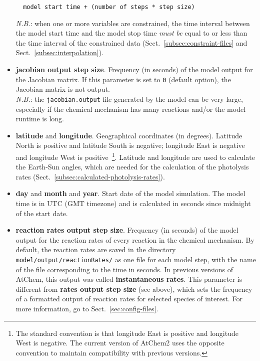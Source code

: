 \begin{itemize}
\begin{verbatim}
  model start time + (number of steps * step size)
  \end{verbatim}
  \textit{N.B.}: when one or more variables are constrained, the time
  interval between the model start time and the model stop time
  \emph{must be} equal to or less than the time interval of the
  constrained data (Sect.~\ref{subsec:constraint-files} and
  Sect.~\ref{subsec:interpolation}).
\item \textbf{jacobian output step size}. Frequency (in seconds) of
  the model output for the Jacobian matrix. If this parameter is set
  to \texttt{0} (default option), the Jacobian matrix is not
  output.\\
  \textit{N.B.}: the \texttt{jacobian.output} file generated by the
  model can be very large, especially if the chemical mechanism has
  many reactions and/or the model runtime is long.
\item \textbf{latitude} and \textbf{longitude}. Geographical
  coordinates (in degrees). Latitude North is positive and latitude
  South is negative; longitude East is negative and longitude West is
  positive~\footnote{The standard convention is that longitude East is
    positive and longitude West is negative. The current version of
    AtChem2 uses the opposite convention to maintain compatibility
    with previous versions.}. Latitude and longitude are used to
  calculate the Earth-Sun angles, which are needed for the calculation
  of the photolysis rates (Sect.~\ref{subsec:calculated-photolysis-rates}).
\item \textbf{day} and \textbf{month} and \textbf{year}. Start date of
  the model simulation. The model time is in UTC (GMT timezone) and is
  calculated in seconds since midnight of the start date.
\item \textbf{reaction rates output step size}. Frequency (in seconds)
  of the model output for the reaction rates of every reaction in the
  chemical mechanism. By default, the reaction rates are saved in the
  directory \texttt{model/output/reactionRates/} as one file for each
  model step, with the name of the file corresponding to the time in
  seconds. In previous versions of AtChem, this output was called
  \textbf{instantaneous rates}. This parameter is different from
  \textbf{rates output step size} (see above), which sets the
  frequency of a formatted output of reaction rates for selected
  species of interest. For more information, go to
  Sect.~\ref{sec:config-files}.
\end{itemize}

